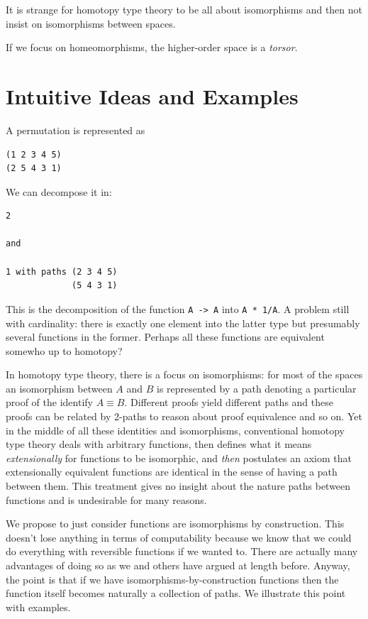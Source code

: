 \documentclass[11pt]{article}
\begin{document}
It is strange for homotopy type theory to be all about isomorphisms and then
not insist on isomorphisms between spaces.

If we focus on homeomorphisms, the higher-order space is a \emph{torsor}.

\section{Intuitive Ideas and Examples} 
\label{sec:intuition}


A permutation is represented as

\begin{verbatim}
(1 2 3 4 5)
(2 5 4 3 1)
\end{verbatim}

We can decompose it in:

\begin{verbatim}
2

and 

1 with paths (2 3 4 5)
             (5 4 3 1)
\end{verbatim}

This is the decomposition of the function \verb|A -> A| into
\verb|A * 1/A|. A problem still with cardinality: there is exactly one
element into the latter type but presumably several functions in the
former. Perhaps all these functions are equivalent somewho up to homotopy?

In homotopy type theory, there is a focus on isomorphisms: for most of the
spaces an isomorphism between $A$ and $B$ is represented by a path denoting a
particular proof of the identify $A \equiv B$. Different proofs yield
different paths and these proofs can be related by 2-paths to reason about
proof equivalence and so on. Yet in the middle of all these identities and
isomorphisms, conventional homotopy type theory deals with arbitrary
functions, then defines what it means \emph{extensionally} for functions to
be isomorphic, and \emph{then} postulates an axiom that extensionally
equivalent functions are identical in the sense of having a path between
them. This treatment gives no insight about the nature paths between
functions and is undesirable for many reasons. 

We propose to just consider functions are isomorphisms by construction. This
doesn't lose anything in terms of computability because we know that we could
do everything with reversible functions if we wanted to. There are actually
many advantages of doing so as we and others have argued at length
before. Anyway, the point is that if we have isomorphisms-by-construction
functions then the function itself becomes naturally a collection of
paths. We illustrate this point with examples.
\end{document}

